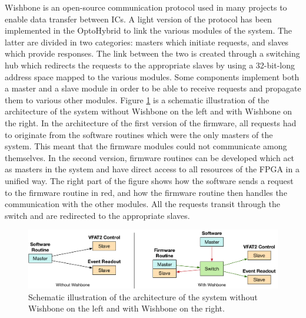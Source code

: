       Wishbone is an open-source communication protocol used in many projects to enable data transfer between ICs. A light version of the protocol has been implemented in the OptoHybrid to link the various modules of the system. The latter are divided in two categories: masters which initiate requests, and slaves which provide responses. The link between the two is created through a switching hub which redirects the requests to the appropriate slaves by using a 32-bit-long address space mapped to the various modules. Some components implement both a master and a slave module in order to be able to receive requests and propagate them to various other modules. Figure \ref{fig:II-3-wishbone-arch} is a schematic illustration of the architecture of the system without Wishbone on the left and with Wishbone on the right. In the architecture of the first version of the firmware, all requests had to originate from the software routines which were the only masters of the system. This meant that the firmware modules could not communicate among themselves. In the second version, firmware routines can be developed which act as masters in the system and have direct access to all resources of the FPGA in a unified way. The right part of the figure shows how the software sends a request to the firmware routine in red, and how the firmware routine then handles the communication with the other modules. All the requests transit through the switch and are redirected to the appropriate slaves. \\

      \begin{figure}[h!]
        \centering
        \includegraphics[width=\textwidth]{img/II-3-test-beam/wishbone_arch}
        \caption{Schematic illustration of the architecture of the system without Wishbone on the left and with Wishbone on the right.}
        \label{fig:II-3-wishbone-arch}
      \end{figure}

